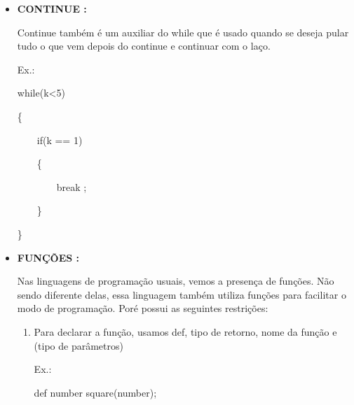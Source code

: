 \documentclass[a4paper]{article}
\begin{document}
{{{{{{{{\begin{itemize}
            \ \ \ \ \ \ \ \ \textcolor{NavyBlue}{break}
                    ;
              
            \ \ \ \ \}
           
            \}
        
\newpage %
            
        \item \textbf{CONTINUE :}
            
            Continue também é um auxiliar do while que é
            usado quando se deseja pular tudo o que vem
            depois do continue e continuar com o laço.
            
            \textcolor{NavyBlue}{Ex.:}
            
            while(k<5)
            
            \{
            
            \ \ \ \ if(k == 1)
              
            \ \ \ \ \{
              
            \ \ \ \ \ \ \ \ \textcolor{NavyBlue}{break}
                    ;
              
            \ \ \ \ \}
           
            \}
        
        \bigskip   
                           
        \item \textbf{FUNÇÕES :}
            
            Nas linguagens de programação usuais, vemos a
            presença de funções.
            Não sendo diferente delas, essa linguagem também
            utiliza funções para facilitar o modo de programação.
            Poré possui as seguintes restrições:
                       
            \begin{enumerate}
                
                \item Para declarar a função, usamos 
           	        \textcolor{NavyBlue}{def}, tipo de retorno, nome
            	    da função e (tipo de parâmetros)
            	
                	\textcolor{NavyBlue}{Ex.:}
                	
                	\textcolor{NavyBlue}{def}
                	number square(number);
                	
            	\bigskip


\end{enumerate}
\end{itemize}}}}}}}}}
\end{document}
